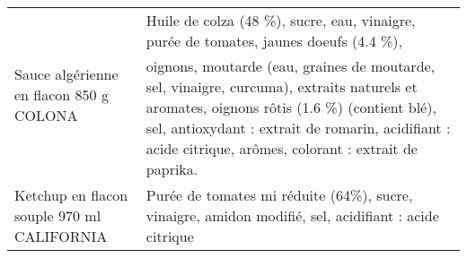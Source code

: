 \begin{longtable}{p{5cm}p{10cm}}
                                                                  Sauce algérienne en flacon 850 g COLONA &                                                                                                                                                                                                                                                                                                                                                                                                                                                                                                                                                                                                                                                                                             Huile de colza (48 \%), sucre, eau, vinaigre, purée de tomates, jaunes doeufs (4.4 \%), oignons, moutarde (eau, graines de moutarde, sel, vinaigre, curcuma), extraits naturels et aromates, oignons rôtis (1.6 \%) (contient blé), sel, antioxydant : extrait de romarin, acidifiant : acide citrique, arômes, colorant : extrait de paprika. \\
                                                               Ketchup en flacon souple 970 ml CALIFORNIA &                                                                                                                                                                                                                                                                                                                                                                                                                                                                                                                                                                                                                                                                                                                                                                                                                                                                                                                                     Purée de tomates mi réduite (64\%), sucre, vinaigre, amidon modifié, sel, acidifiant : acide citrique \\

\end{longtable}
